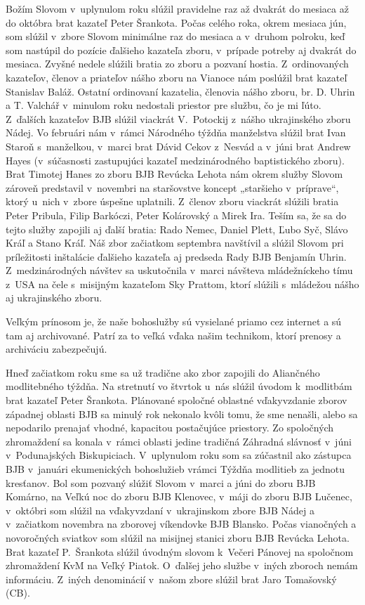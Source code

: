 Božím Slovom v~uplynulom roku slúžil pravidelne raz až dvakrát do mesiaca až do októbra brat kazateľ Peter Šrankota. Počas celého roka, okrem mesiaca jún, som slúžil v~zbore Slovom minimálne raz do mesiaca a v~druhom polroku, keď som nastúpil do pozície ďalšieho kazateľa zboru, v~prípade potreby aj dvakrát do mesiaca. Zvyšné nedele slúžili bratia zo zboru a pozvaní hostia. Z~ordinovaných kazateľov, členov a priateľov nášho zboru na Vianoce nám poslúžil brat kazateľ Stanislav Baláž. Ostatní ordinovaní kazatelia, členovia nášho zboru, br. D. Uhrin a T. Valchář v~minulom roku nedostali priestor pre službu, čo je mi ľúto. Z~ďalších kazateľov BJB slúžil viackrát V.~Potockij z~nášho ukrajinského zboru Nádej. Vo februári nám v~rámci Národného týždňa manželstva slúžil brat Ivan Staroň s~manželkou, v~marci brat Dávid Cekov z~Nesvád a v~júni brat Andrew Hayes (v~súčasnosti zastupujúci kazateľ medzinárodného baptistického zboru). Brat Timotej Hanes zo zboru BJB Revúcka Lehota nám okrem služby Slovom zároveň predstavil v~novembri na staršovstve koncept „staršieho v~príprave“, ktorý u~nich v~zbore úspešne uplatnili. Z~členov zboru viackrát slúžili bratia Peter Pribula, Filip Barkóczi, Peter Kolárovský a Mirek Ira. Teším sa, že sa do tejto služby zapojili aj ďalší bratia: Rado Nemec, Daniel Plett, Ľubo Syč, Slávo Kráľ a Stano Kráľ. Náš zbor začiatkom septembra navštívil a slúžil Slovom pri príležitosti inštalácie ďalšieho kazateľa aj predseda Rady BJB Benjamín Uhrin. Z~medzinárodných návštev sa uskutočnila v~marci návšteva mládežníckeho tímu z~USA na čele s~misijným kazateľom Sky Prattom, ktorí slúžili s~mládežou nášho aj ukrajinského zboru.

Veľkým prínosom je, že naše bohoslužby sú vysielané priamo cez internet a sú tam aj archivované. Patrí za to veľká vďaka našim technikom, ktorí prenosy a archiváciu zabezpečujú.


Hneď začiatkom roku sme sa už tradične ako zbor zapojili do Aliančného modlitebného týždňa. Na stretnutí vo štvrtok u~nás slúžil úvodom k~modlitbám brat kazateľ Peter Šrankota.
Plánované spoločné oblastné vďakyvzdanie zborov západnej oblasti BJB sa minulý rok nekonalo kvôli tomu, že sme nenašli, alebo sa nepodarilo prenajať vhodné, kapacitou postačujúce priestory. Zo spoločných zhromaždení sa konala v~rámci oblasti jedine tradičná Záhradná slávnosť v~júni v~Podunajských Biskupiciach. V~uplynulom roku som sa zúčastnil ako zástupca BJB v~januári ekumenických bohoslužieb vrámci Týždňa modlitieb za jednotu kresťanov. Bol som pozvaný slúžiť Slovom v~marci a júni do zboru BJB Komárno, na Veľkú noc do zboru BJB Klenovec, v~máji do zboru BJB Lučenec, v~októbri som slúžil na vďakyvzdaní v~ukrajinskom zbore BJB Nádej a v~začiatkom novembra na zborovej víkendovke BJB Blansko. Počas vianočných a novoročných sviatkov som slúžil na misijnej stanici zboru BJB Revúcka Lehota. Brat kazateľ P.~Šrankota slúžil úvodným slovom k~Večeri Pánovej na spoločnom zhromaždení KvM na Veľký Piatok. O~ďalšej jeho službe v~iných zboroch nemám informáciu.
Z~iných denominácií v~našom zbore slúžil brat Jaro Tomašovský (CB).

